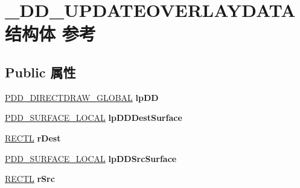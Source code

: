 \hypertarget{struct___d_d___u_p_d_a_t_e_o_v_e_r_l_a_y_d_a_t_a}{}\section{\+\_\+\+D\+D\+\_\+\+U\+P\+D\+A\+T\+E\+O\+V\+E\+R\+L\+A\+Y\+D\+A\+T\+A结构体 参考}
\label{struct___d_d___u_p_d_a_t_e_o_v_e_r_l_a_y_d_a_t_a}
\subsection*{Public 属性}
\begin{DoxyCompactItemize}
\item 
\mbox{\label{struct___d_d___u_p_d_a_t_e_o_v_e_r_l_a_y_d_a_t_a_a4fdc8da46a4decf1a67c7b88d847b298}} 
\hyperlink{struct___d_d___d_i_r_e_c_t_d_r_a_w___g_l_o_b_a_l}{P\+D\+D\+\_\+\+D\+I\+R\+E\+C\+T\+D\+R\+A\+W\+\_\+\+G\+L\+O\+B\+AL} {\bfseries lp\+DD}
\item 
\mbox{\label{struct___d_d___u_p_d_a_t_e_o_v_e_r_l_a_y_d_a_t_a_a752882130feff86e7cce34bc0f9bca60}} 
\hyperlink{struct___d_d___s_u_r_f_a_c_e___l_o_c_a_l}{P\+D\+D\+\_\+\+S\+U\+R\+F\+A\+C\+E\+\_\+\+L\+O\+C\+AL} {\bfseries lp\+D\+D\+Dest\+Surface}
\item 
\mbox{\label{struct___d_d___u_p_d_a_t_e_o_v_e_r_l_a_y_d_a_t_a_af7db7d70f0762a0ea4b3f72e83fb7876}} 
\hyperlink{struct___r_e_c_t_l}{R\+E\+C\+TL} {\bfseries r\+Dest}
\item 
\mbox{\label{struct___d_d___u_p_d_a_t_e_o_v_e_r_l_a_y_d_a_t_a_a9934f3b8a1e3c9cfec0109a6f2d99bcb}} 
\hyperlink{struct___d_d___s_u_r_f_a_c_e___l_o_c_a_l}{P\+D\+D\+\_\+\+S\+U\+R\+F\+A\+C\+E\+\_\+\+L\+O\+C\+AL} {\bfseries lp\+D\+D\+Src\+Surface}
\item 
\mbox{\label{struct___d_d___u_p_d_a_t_e_o_v_e_r_l_a_y_d_a_t_a_a9d93551eeb0ec52c6541a3e10130ec43}} 
\hyperlink{struct___r_e_c_t_l}{R\+E\+C\+TL} {\bfseries r\+Src}
\item 
\mbox{\label{struct___d_d___u_p_d_a_t_e_o_v_e_r_l_a_y_d_a_t_a_a6e593e3f9aaac0a6d1e11292e010a8e3}} 

\end{DoxyCompactItemize}

